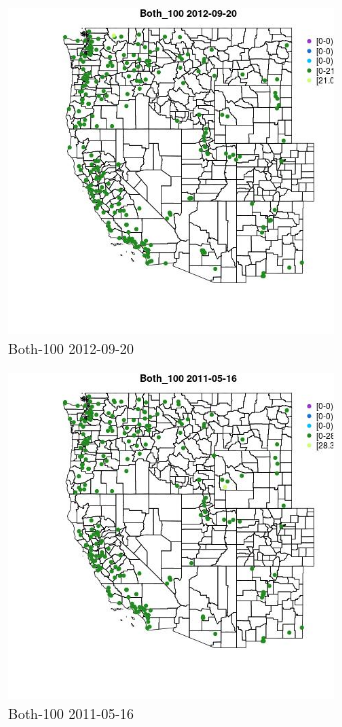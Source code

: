 \begin{figure} 
\centering  
\includegraphics[width=0.77\textwidth]{Code_Outputs/ML_input_report_ML_input_PM25_Step5_part_d_de_duplicated_aves_ML_input_MapObsBoth_1002012-09-20.jpg} 
\caption{\label{fig:ML_input_report_ML_input_PM25_Step5_part_d_de_duplicated_aves_ML_inputMapObsBoth_1002012-09-20}Both-100 2012-09-20} 
\end{figure} 
 

\begin{figure} 
\centering  
\includegraphics[width=0.77\textwidth]{Code_Outputs/ML_input_report_ML_input_PM25_Step5_part_d_de_duplicated_aves_ML_input_MapObsBoth_1002011-05-16.jpg} 
\caption{\label{fig:ML_input_report_ML_input_PM25_Step5_part_d_de_duplicated_aves_ML_inputMapObsBoth_1002011-05-16}Both-100 2011-05-16} 
\end{figure} 
 

